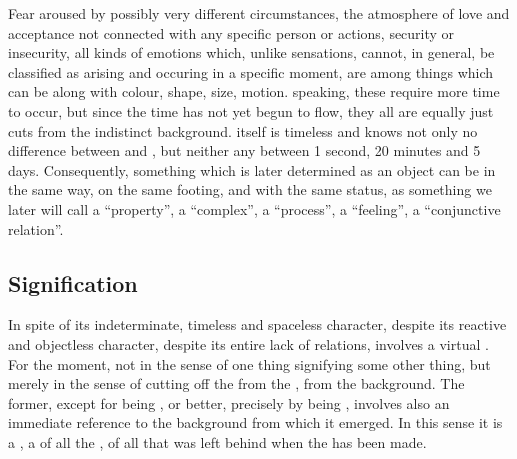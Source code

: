 Fear aroused by possibly very different circumstances, the atmosphere of love
and acceptance not connected with any specific person or actions, security or
insecurity, all kinds of emotions which, unlike sensations, cannot, in general,
be classified as arising and occuring in a specific moment, are among things
which can be  along with colour, shape, size, motion.
 speaking, these  require more time to occur,
but since the time has not yet begun to flow, they all are equally just
{cuts} from the indistinct background.  itself is
timeless and knows not only no difference between  and , but
neither any between 1 second, 20 minutes and 5 days.  Consequently, something
which is later determined as an object can be  in the same
way, on the same footing, and with the same status, as something we later will
call a ``property'', a ``complex'', a ``process'', a ``feeling'', a
``conjunctive relation''.
%
%


\subsection{Signification}
\pa\label{pa:signA} In spite of its indeterminate, timeless and spaceless
character, despite its reactive and objectless character, despite its entire
lack of relations,  involves a virtual . For
the moment, not in the sense of one thing signifying some other thing, but
merely in the sense of {cutting} off the   from
the , from the background. The former, except for being
, or better, precisely by being , involves
also an immediate reference to the background from which it emerged. In this
sense it is a , a  of all the , of all that was left
behind when the  has been made.

